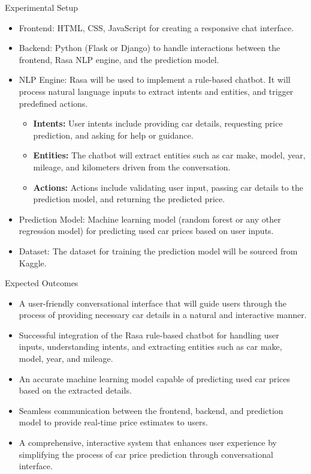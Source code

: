 \documentclass{beamer}
\begin{document}
\begin{frame}[t]{Experimental Setup}
    \begin{itemize}
        \item Frontend: HTML, CSS, JavaScript for creating a responsive chat interface.
        \item Backend: Python (Flask or Django) to handle interactions between the frontend, Rasa NLP engine, and the prediction model.
        \item NLP Engine: Rasa will be used to implement a rule-based chatbot. It will process natural language inputs to extract intents and entities, and trigger predefined actions.
        \begin{itemize}
            \item \textbf{Intents:} User intents include providing car details, requesting price prediction, and asking for help or guidance.
            \item \textbf{Entities:} The chatbot will extract entities such as car make, model, year, mileage, and kilometers driven from the conversation.
            \item \textbf{Actions:} Actions include validating user input, passing car details to the prediction model, and returning the predicted price.
        \end{itemize}
        \item Prediction Model: Machine learning model (random forest or any other regression model) for predicting used car prices based on user inputs.
        \item Dataset: The dataset for training the prediction model will be sourced from Kaggle.
    \end{itemize}
\end{frame}

\begin{frame}[t]{Expected Outcomes}
    \begin{itemize}
        \item A user-friendly conversational interface that will guide users through the process of providing necessary car details in a natural and interactive manner.
        \item Successful integration of the Rasa rule-based chatbot for handling user inputs, understanding intents, and extracting entities such as car make, model, year, and mileage.
        \item An accurate machine learning model capable of predicting used car prices based on the extracted details.
        \item Seamless communication between the frontend, backend, and prediction model to provide real-time price estimates to users.
        \item A comprehensive, interactive system that enhances user experience by simplifying the process of car price prediction through conversational interface.
    \end{itemize}
\end{frame}
\end{document}
